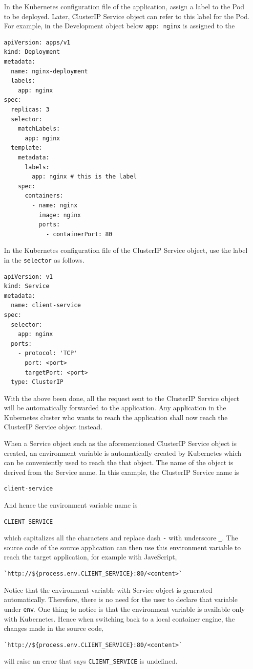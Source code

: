 In the Kubernetes configuration file of the application, assign a label to the Pod to be deployed. Later, ClusterIP Service object can refer to this label for the Pod. For example, in the Development object below \texttt{app: nginx} is assigned to the 
\begin{lstlisting}
apiVersion: apps/v1
kind: Deployment
metadata:
  name: nginx-deployment
  labels:
    app: nginx
spec:
  replicas: 3
  selector:
    matchLabels:
      app: nginx
  template:
    metadata:
      labels:
        app: nginx # this is the label
    spec:
      containers:
        - name: nginx
          image: nginx
          ports:
            - containerPort: 80
\end{lstlisting}
In the Kubernetes configuration file of the ClusterIP Service object, use the label in the \verb|selector| as follows.
\begin{lstlisting}
apiVersion: v1
kind: Service
metadata:
  name: client-service
spec:
  selector:
    app: nginx
  ports:
    - protocol: 'TCP'
      port: <port>
      targetPort: <port>
  type: ClusterIP
\end{lstlisting}
With the above been done, all the request sent to the ClusterIP Service object will be automatically forwarded to the application. Any application in the Kubernetes cluster who wants to reach the application shall now reach the ClusterIP Service object instead.

When a Service object such as the aforementioned ClusterIP Service object is created, an environment variable is automatically created by Kubernetes which can be conveniently used to reach the that object. The name of the object is derived from the Service name. In this example, the ClusterIP Service name is
\begin{lstlisting}
client-service
\end{lstlisting}
And hence the environment variable name is
\begin{lstlisting}
CLIENT_SERVICE
\end{lstlisting}
which capitalizes all the characters and replace dash \verb|-| with underscore \verb|_|. The source code of the source application can then use this environment variable to reach the target application, for example with JaveScript,
\begin{lstlisting}
`http://${process.env.CLIENT_SERVICE}:80/<content>`
\end{lstlisting}

Notice that the environment variable with Service object is generated automatically. Therefore, there is no need for the user to declare that variable under \verb|env|. One thing to notice is that the environment variable is available only with Kubernetes. Hence when switching back to a local container engine, the changes made in the source code, 
\begin{lstlisting}
`http://${process.env.CLIENT_SERVICE}:80/<content>`
\end{lstlisting}
will raise an error that says \verb|CLIENT_SERVICE| is undefined.

